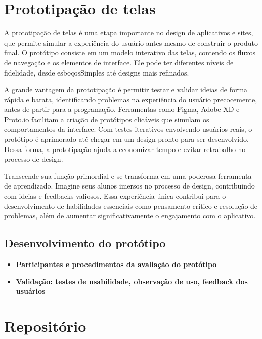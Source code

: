 \begin{itemize}
\begin{itemize}
\begin{itemize}
\end{itemize}

\section{Prototipação de telas}

A prototipação de telas é uma etapa importante no design de aplicativos e sites, que permite simular a experiência do usuário antes mesmo de construir o produto final. O protótipo consiste em um modelo interativo das telas, contendo os fluxos de navegação e os elementos de interface. Ele pode ter diferentes níveis de fidelidade, desde esboçosSimples até designs mais refinados. 

A grande vantagem da prototipação é permitir testar e validar ideias de forma rápida e barata, identificando problemas na experiência do usuário precocemente, antes de partir para a programação. Ferramentas como Figma, Adobe XD e Proto.io facilitam a criação de protótipos clicáveis que simulam os comportamentos da interface. Com testes iterativos envolvendo usuários reais, o protótipo é aprimorado até chegar em um design pronto para ser desenvolvido. Dessa forma, a prototipação ajuda a economizar tempo e evitar retrabalho no processo de design.

Transcende sua função primordial e se transforma em uma poderosa ferramenta de aprendizado. Imagine seus alunos imersos no processo de design, contribuindo com ideias e feedbacks valiosos. Essa experiência única contribui para o desenvolvimento de habilidades essenciais como pensamento crítico e resolução de problemas, além de aumentar significativamente o engajamento com o aplicativo.

\subsection{Desenvolvimento do protótipo}


\begin{itemize}
    \item \textbf{Participantes e procedimentos da avaliação do protótipo}
    \item \textbf{Validação: testes de usabilidade, observação de uso, feedback dos usuários}
    
\end{itemize}

\section{Repositório}


\end{itemize}
\end{itemize}
